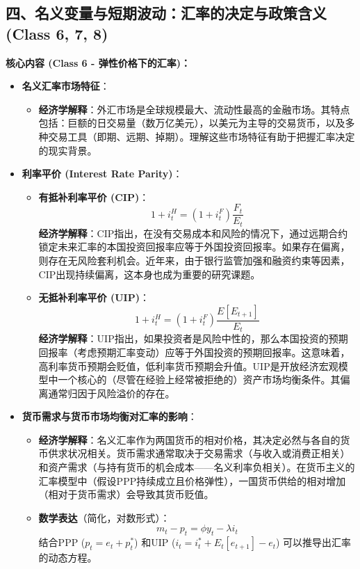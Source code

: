 \documentclass[12pt]{article}
\begin{document}
\subsection*{四、名义变量与短期波动：汇率的决定与政策含义 (Class 6, 7, 8)}

\textbf{核心内容 (Class 6 - 弹性价格下的汇率)：}
\begin{itemize}
    \item \textbf{名义汇率市场特征}：
    \begin{itemize}
        \item \textbf{经济学解释}：外汇市场是全球规模最大、流动性最高的金融市场。其特点包括：巨额的日交易量（数万亿美元），以美元为主导的交易货币，以及多种交易工具（即期、远期、掉期）。理解这些市场特征有助于把握汇率决定的现实背景。
    \end{itemize}
    \item \textbf{利率平价 (Interest Rate Parity)}：
    \begin{itemize}
        \item \textbf{有抵补利率平价 (CIP)}：
        \[
        1+i_t^H = (1+i_t^F) \frac{F_t}{E_t}
        \]
        \textbf{经济学解释}：CIP指出，在没有交易成本和风险的情况下，通过远期合约锁定未来汇率的本国投资回报率应等于外国投资回报率。如果存在偏离，则存在无风险套利机会。近年来，由于银行监管加强和融资约束等因素，CIP出现持续偏离，这本身也成为重要的研究课题。
        \item \textbf{无抵补利率平价 (UIP)}：
        \[
        1+i_t^H = (1+i_t^F) \frac{E[E_{t+1}]}{E_t}
        \]
        \textbf{经济学解释}：UIP指出，如果投资者是风险中性的，那么本国投资的预期回报率（考虑预期汇率变动）应等于外国投资的预期回报率。这意味着，高利率货币预期会贬值，低利率货币预期会升值。UIP是开放经济宏观模型中一个核心的（尽管在经验上经常被拒绝的）资产市场均衡条件。其偏离通常归因于风险溢价的存在。
    \end{itemize}
    \item \textbf{货币需求与货币市场均衡对汇率的影响}：
    \begin{itemize}
        \item \textbf{经济学解释}：名义汇率作为两国货币的相对价格，其决定必然与各自的货币供求状况相关。货币需求通常取决于交易需求（与收入或消费正相关）和资产需求（与持有货币的机会成本——名义利率负相关）。在货币主义的汇率模型中（假设PPP持续成立且价格弹性），一国货币供给的相对增加（相对于货币需求）会导致其货币贬值。
        \item \textbf{数学表达}（简化，对数形式）：
        \[
        m_t - p_t = \phi y_t - \lambda i_t
        \]
        结合PPP ($p_t = e_t + p_t^*$) 和UIP ($i_t = i_t^* + E_t[e_{t+1}] - e_t$) 可以推导出汇率的动态方程。

\end{itemize}
\end{itemize}
\end{document}
